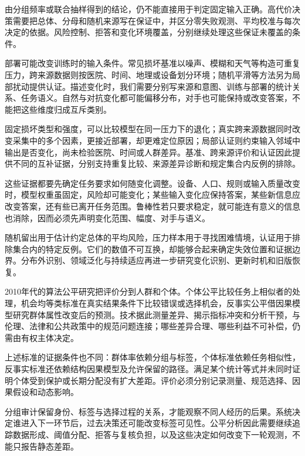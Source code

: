 由分组频率或联合抽样得到的结论，仍不能直接用于判定固定输入正确。高代价决策需要把总体、分母和随机来源写在保证中，并区分零失败观测、平均校准与每次决定的依据。风险控制、拒答和变化环境覆盖，分别继续处理这些保证未覆盖的条件。

部署可能改变训练时的输入条件。常见损坏基准以噪声、模糊和天气等构造可重复压力，跨来源数据则按医院、时间、地理或设备划分环境；随机平滑等方法另为局部扰动提供认证。描述变化时，我们需要分别写来源和意图、训练与部署的统计关系、任务语义。自然与对抗变化都可能偏移分布，对手也可能保持或改变答案，不能把这些维度归成互斥类别。

固定损坏类型和强度，可以比较模型在同一压力下的退化；真实跨来源数据同时改变采集中的多个因素，更接近部署，却更难定位原因；局部认证则约束输入邻域中输出是否变化，尚未检验医院、时间或人群差异。基准、跨来源评价和认证因此提供不同的互补证据，分别支持重复比较、来源差异诊断和规定集合内反例的排除。

这些证据都要先确定任务要求如何随变化调整。设备、人口、规则或输入质量改变时，模型权重虽固定，风险却可能变化；某些输入变化应保持答案，某些新信息应改变答案，还有些已离开任务范围。鲁棒性若只要求稳定，就可能连有意义的信息也消除，因而必须先声明变化范围、幅度、对手与语义。

随机留出用于估计约定总体的平均风险，压力样本用于寻找困难情境，认证用于排除集合内的特定反例。它们的数值不可互换，却能够合起来确定失效位置和证据边界。分布外识别、领域泛化与持续适应再进一步研究变化识别、更新时机和旧版恢复。

2010年代的算法公平研究把评价分到人群和个体。个体公平比较任务上相似者的处理，机会均等类标准在真实结果条件下比较错误或选择机会，反事实公平借因果模型研究群体属性改变后的预测。技术据此测量差异、揭示指标冲突和分析干预，与伦理、法律和公共政策中的规范问题连接；哪些差异合理、哪些利益不可补偿，仍需由有权主体决定。

上述标准的证据条件也不同：群体率依赖分组与标签，个体标准依赖任务相似性，反事实标准还依赖结构因果模型及允许保留的路径。满足某个统计等式并未同时证明个体受到保护或长期分配没有扩大差距。评价必须分别记录测量、规范选择、因果假设和动态影响。

分组审计保留身份、标签与选择过程的关系，才能观察不同人经历的后果。系统决定谁进入下一环节后，过去决策还可能改变标签可见性。公平分析因此需要继续追踪数据形成、阈值分配、拒答与复核负担，以及这些决定如何改变下一轮观测，不能只报告静态差距。

